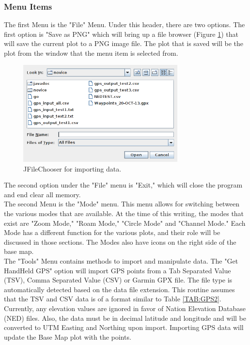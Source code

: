 \documentclass[12pt]{article}
\begin{document}
\subsubsection{Menu Items}

The first Menu is the "File" Menu. Under this header, there are two options. The first option is "Save as PNG"  which will bring up a file browser (Figure \ref{FIG:PNG}) that will save the current plot to a PNG image file. The plot that is saved will be the plot from the window that the menu item is selected from.

\begin{figure}[H]
\centering
\includegraphics[width=0.75\textwidth]{./figs/fig0.png}
\caption{JFileChooser for importing data.}
\label{FIG:PNG}
\end{figure}

The second option under the "File" menu is "Exit," which will close the program and end clear all memory. \\

The second Menu is the "Mode" menu. This menu allows for switching between the various modes that are available. At the time of this writing, the modes that exist are "Zoom Mode," "Roam Mode," "Circle Mode" and "Channel Mode." Each Mode has a different function for the various plots, and their role will be discussed in those sections. The Modes also have icons on the right side of the base map. \\

The "Tools" Menu contains methods to import and manipulate data. The "Get HandHeld GPS" option will import GPS points from a Tab Separated Value (TSV), Comma Separated Value (CSV) or Garmin GPX file. The file type is automatically detected based on the data file extension. This routine assumes that the TSV and CSV data is of a format similar to Table \ref{TAB:GPS2}. Currently, any elevation values are ignored in favor of Nation Elevation Database (NED) files. Also, the data must be in decimal latitude and longitude and will be converted to UTM Easting and Northing upon import. Importing GPS data will update the Base Map plot with the points.\\
\end{document}
